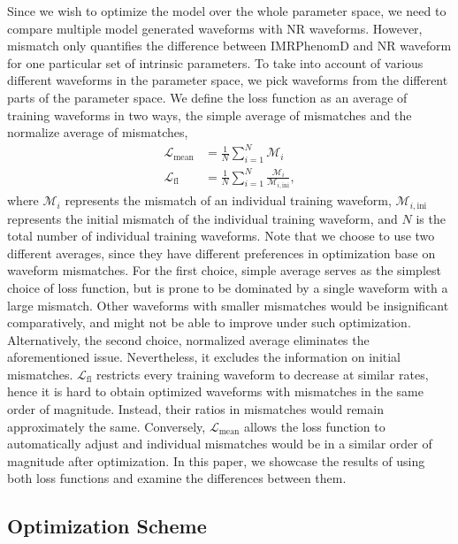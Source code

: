 \documentclass[twocolumn]{aastex631}
\begin{document}
Since we wish to optimize the model over the whole parameter space, we need to compare multiple model generated waveforms with NR waveforms. However, mismatch only quantifies the difference between IMRPhenomD and NR waveform for one particular set of intrinsic parameters. To take into account of various different waveforms in the parameter space, we pick waveforms from the different parts of the parameter space. We define the loss function as an average of training waveforms in two ways, the simple average of mismatches and the normalize average of mismatches,  
\begin{align}
	\mathcal{L}_{\mathrm{mean}}&=\frac{1}{N}\sum_{i=1}^N\mathcal{M}_i \\
	\mathcal{L}_{\mathrm{fl}}&=\frac{1}{N}\sum_{i=1}^N\frac{\mathcal{M}_i}{\mathcal{M}_{i,\mathrm{ini}}},
\end{align}	
where $\mathcal{M}_i$ represents the mismatch of an individual training waveform,
$\mathcal{M}_{i,\mathrm{ini}}$ represents the initial mismatch of the individual
training waveform, and $N$ is the total number of individual training waveforms.
Note that we choose to use two different averages, since they have different 
preferences in optimization base on waveform mismatches. For the first choice, simple average serves as the simplest choice of loss function, but is prone to be dominated by a single waveform with a large mismatch. Other waveforms with smaller mismatches would be
insignificant comparatively, and might not be able to improve under such
optimization. Alternatively, the second choice, normalized average eliminates the aforementioned issue. Nevertheless, it excludes the
information on initial mismatches. $\mathcal{L}_{\mathrm{fl}}$ restricts every
training waveform to decrease at similar rates, hence it is hard to obtain
optimized waveforms with mismatches in the same order of magnitude. Instead,
their ratios in mismatches would remain approximately the same. Conversely,
$\mathcal{L}_{\mathrm{mean}}$ allows the loss function to automatically adjust
and individual mismatches would be in a similar order of magnitude after 
optimization. In this paper, we showcase the results of using both loss functions 
and examine the differences between them. 

\subsection{Optimization Scheme} \label{subsec:optimization}
\end{document}

